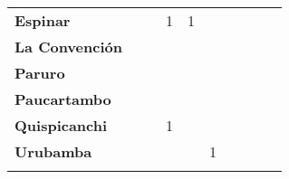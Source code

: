 \begin{tabular}{lccccccccc}
	\textbf{Espinar}       					                 						   
	&\cellcolor[HTML]{FCC46C} 					&\cellcolor[HTML]{FCC46C} 		 
	&1											&1									
	&\cellcolor[HTML]{FCC46C}				    &\cellcolor[HTML]{FCC46C}
	&\cellcolor[HTML]{FCC46C} 					&\cellcolor[HTML]{FCC46C}
	&\cellcolor[HTML]{FCC46C} \\
	\textbf{La Convención}                      
	&\cellcolor[HTML]{FCC46C}              		&\cellcolor[HTML]{FCC46C} 			
	&\cellcolor[HTML]{FCC46C}					&\cellcolor[HTML]{FCC46C}  					&\cellcolor[HTML]{FCC46C} 		            &\cellcolor[HTML]{FCC46C} 					
	&\cellcolor[HTML]{FCC46C} 					&\cellcolor[HTML]{FCC46C}
	&\cellcolor[HTML]{FCC46C}\\
	\textbf{Paruro}                            
	&\cellcolor[HTML]{FCC46C}              	    &\cellcolor[HTML]{FCC46C}        			&\cellcolor[HTML]{FCC46C}                   &\cellcolor[HTML]{FCC46C}   				&\cellcolor[HTML]{FCC46C} 					&\cellcolor[HTML]{FCC46C}		 			&\cellcolor[HTML]{FCC46C}					&\cellcolor[HTML]{FCC46C}
	&\cellcolor[HTML]{FCC46C}\\
	\textbf{Paucartambo}               		                       
	&\cellcolor[HTML]{FCC46C} 					&\cellcolor[HTML]{FCC46C}					&\cellcolor[HTML]{FCC46C}					
	&\cellcolor[HTML]{FCC46C}					&\cellcolor[HTML]{FCC46C}                   &\cellcolor[HTML]{FCC46C} 					&\cellcolor[HTML]{FCC46C}
	&\cellcolor[HTML]{FCC46C}					&\cellcolor[HTML]{FCC46C}\\
	\textbf{Quispicanchi}                                         	                  
	&\cellcolor[HTML]{FCC46C} 					
	&\cellcolor[HTML]{FCC46C}					&1
	&\cellcolor[HTML]{FCC46C}					&\cellcolor[HTML]{FCC46C} 
	&\cellcolor[HTML]{FCC46C}					&\cellcolor[HTML]{FCC46C}
	&\cellcolor[HTML]{FCC46C}					&\cellcolor[HTML]{FCC46C}\\
	\textbf{Urubamba}                                                    
    &\cellcolor[HTML]{FCC46C}      
	&\cellcolor[HTML]{FCC46C}					&\cellcolor[HTML]{FCC46C}		
	&\cellcolor[HTML]{FCC46C}					&1
	&\cellcolor[HTML]{FCC46C}					&\cellcolor[HTML]{FCC46C}
	&\cellcolor[HTML]{FCC46C}					&\cellcolor[HTML]{FCC46C}\\
	&\multicolumn{1}{l}{}                       &\multicolumn{1}{l}{}            &\multicolumn{1}{l}{}                         
	&\multicolumn{1}{l}{}                       &\multicolumn{1}{l}{}            &\multicolumn{1}{l}{}                       &\multicolumn{1}{l}{}                       &\multicolumn{1}{l}{}            &\multicolumn{1}{l}{}    
\end{tabular}